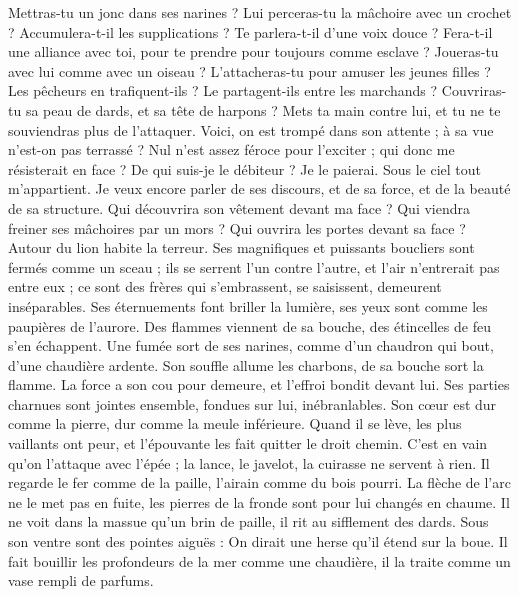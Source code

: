 \begin{multicols}{2}
Mettras-tu un jonc dans ses narines ? Lui perceras-tu la mâchoire avec un crochet ?
Accumulera-t-il les supplications ? Te parlera-t-il d'une voix douce ?
Fera-t-il une alliance avec toi, pour te prendre pour toujours comme esclave ?
Joueras-tu avec lui comme avec un oiseau ? L'attacheras-tu pour amuser les jeunes filles ?
Les pêcheurs en trafiquent-ils ? Le partagent-ils entre les marchands ?
Couvriras-tu sa peau de dards, et sa tête de harpons ?
Mets ta main contre lui, et tu ne te souviendras plus de l'attaquer.
Voici, on est trompé dans son attente ; à sa vue n'est-on pas terrassé ?
\VerseOne{}Nul n'est assez féroce pour l'exciter ; qui donc me résisterait en face ?
De qui suis-je le débiteur ? Je le paierai. Sous le ciel tout m'appartient.
Je veux encore parler de ses discours, et de sa force, et de la beauté de sa structure.
Qui découvrira son vêtement devant ma face ? Qui viendra freiner ses mâchoires par un mors ?
Qui ouvrira les portes devant sa face ? Autour du lion habite la terreur.
Ses magnifiques et puissants boucliers sont fermés comme un sceau ;
ils se serrent l'un contre l'autre, et l'air n'entrerait pas entre eux ;
ce sont des frères qui s'embrassent, se saisissent, demeurent inséparables.
Ses éternuements font briller la lumière, ses yeux sont comme les paupières de l'aurore.
Des flammes viennent de sa bouche, des étincelles de feu s'en échappent.
Une fumée sort de ses narines, comme d'un chaudron qui bout, d'une chaudière ardente.
Son souffle allume les charbons, de sa bouche sort la flamme.
La force a son cou pour demeure, et l'effroi bondit devant lui.
Ses parties charnues sont jointes ensemble, fondues sur lui, inébranlables.
Son cœur est dur comme la pierre, dur comme la meule inférieure.
Quand il se lève, les plus vaillants ont peur, et l'épouvante les fait quitter le droit chemin.
C'est en vain qu'on l'attaque avec l'épée ; la lance, le javelot, la cuirasse ne servent à rien.
Il regarde le fer comme de la paille, l'airain comme du bois pourri.
La flèche de l'arc ne le met pas en fuite, les pierres de la fronde sont pour lui changés en chaume.
Il ne voit dans la massue qu'un brin de paille, il rit au sifflement des dards.
Sous son ventre sont des pointes aiguës : On dirait une herse qu'il étend sur la boue.
Il fait bouillir les profondeurs de la mer comme une chaudière, il la traite comme un vase rempli de parfums.

\end{multicols}
